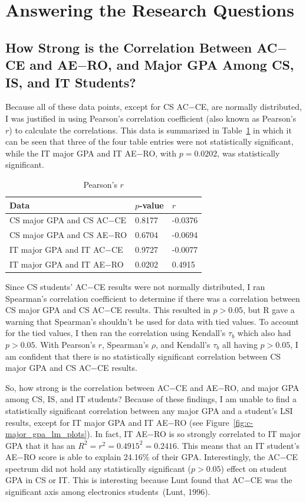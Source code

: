 \section{Answering the Research Questions}
\subsection{How Strong is the Correlation Between AC$-$CE and AE$-$RO, and Major GPA Among CS, IS, and IT Students?}
Because all of these data points, except for CS AC$-$CE, are normally distributed, I was justified in using Pearson's correlation coefficient (also known as Pearson's $r$) to calculate the correlations. This data is summarized in Table~\ref{tab:c-pearsons} in which it can be seen that three of the four table entries were not statistically significant, while the IT major GPA and IT AE$-$RO, with $p=0.0202$, was statistically significant.

\begin{table}[!htbp]
  \centering
  \caption{Pearson's $r$}
  \label{tab:c-pearsons}
  \begin{tabular}{lll}
    \toprule
    Data                      & $p$-value & $r$ \\
    \midrule
    CS major GPA and CS AC$-$CE & 0.8177    & -0.0376 \\
    CS major GPA and CS AE$-$RO & 0.6704    & -0.0694 \\
    IT major GPA and IT AC$-$CE & 0.9727    & -0.0077 \\
    IT major GPA and IT AE$-$RO & 0.0202    &  0.4915 \\
    \bottomrule
  \end{tabular}
\end{table}

Since CS students' AC$-$CE results were not normally distributed, I ran Spearman's correlation coefficient to determine if there was a correlation between CS major GPA and CS AC$-$CE results. This resulted in $p>0.05$, but R gave a warning that Spearman's shouldn't be used for data with tied values. To account for the tied values, I then ran the correlation using Kendall's $\tau_b$ which also had $p>0.05$. With Pearson's $r$, Spearman's $\rho$, and Kendall's $\tau_b$ all having $p>0.05$, I am confident that there is no statistically significant correlation between CS major GPA and CS AC$-$CE results.

So, how strong is the correlation between AC$-$CE and AE$-$RO, and major GPA among CS, IS, and IT students? Because of these findings, I am unable to find a statistically significant correlation between any major GPA and a student's LSI results, except for IT major GPA and IT AE$-$RO (see Figure~\ref{fig:c-major_gpa_lm_plots}). In fact, IT AE$-$RO is so strongly correlated to IT major GPA that it has an $R^2=r^2=0.4915^2=0.2416$. This means that an IT student's AE$-$RO score is able to explain 24.16\% of their GPA. Interestingly, the AC$-$CE spectrum did not hold any statistically significant ($p>0.05$) effect on student GPA in CS or IT. This is interesting because Lunt found that AC$-$CE was the significant axis among electronics students~(Lunt, 1996).

